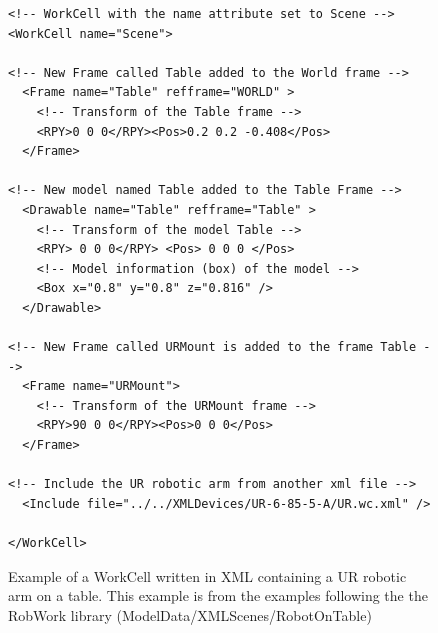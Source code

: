 \begin{figure}[h]
\centering
\lstset{language=XML} 
\begin{lstlisting}[frame=single]
<!-- WorkCell with the name attribute set to Scene -->
<WorkCell name="Scene"> 

<!-- New Frame called Table added to the World frame -->
  <Frame name="Table" refframe="WORLD" >
	<!-- Transform of the Table frame -->
    <RPY>0 0 0</RPY><Pos>0.2 0.2 -0.408</Pos> 
  </Frame>
  
<!-- New model named Table added to the Table Frame -->
  <Drawable name="Table" refframe="Table" >
	<!-- Transform of the model Table -->
    <RPY> 0 0 0</RPY> <Pos> 0 0 0 </Pos>
	<!-- Model information (box) of the model -->
    <Box x="0.8" y="0.8" z="0.816" />
  </Drawable>

<!-- New Frame called URMount is added to the frame Table -->
  <Frame name="URMount">
	<!-- Transform of the URMount frame -->
    <RPY>90 0 0</RPY><Pos>0 0 0</Pos> 
  </Frame>
  
<!-- Include the UR robotic arm from another xml file -->
  <Include file="../../XMLDevices/UR-6-85-5-A/UR.wc.xml" />	

</WorkCell>			 
\end{lstlisting}
\caption{Example of a WorkCell written in XML containing a UR robotic arm on a table. This example is from the examples following the the RobWork library (ModelData/XMLScenes/RobotOnTable)}
\label{fig:XMLCodeExample} 	
\end{figure}

